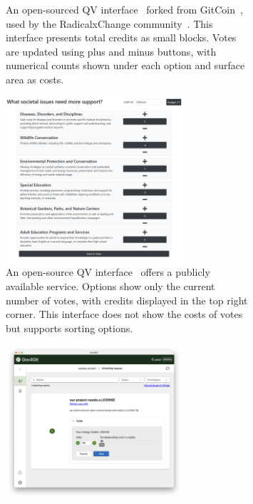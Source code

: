 {\begin{figure}[p]
\begin{subfigure}[b]{0.47\textwidth}
        \caption{An open-sourced QV interface~\cite{RadicalxChangeQuadraticvoting2024} forked from GitCoin~\cite{ReadWhitepaperGitcoin}, used by the RadicalxChange community~\cite{RxC}. This interface presents total credits as small blocks. Votes are updated using plus and minus buttons, with numerical counts shown under each option and surface area as costs.}
        \label{fig:rxcvotingInterface}
    \end{subfigure}
    
    \vspace{0.12cm}
    
    \begin{subfigure}[b]{0.47\textwidth}
        \centering
        \includegraphics[width=0.72\textwidth]{content/image/curr_interface/geek.sg_interface.png}
        \caption{An open-source QV interface~\cite{yehjxraymondYehjxraymondQvapp2024} offers a publicly available service. Options show only the current number of votes, with credits displayed in the top right corner. This interface does not show the costs of votes but supports sorting options.}
        \label{fig:yehInterface}
    \end{subfigure}
    \hspace{0.4cm}
    \begin{subfigure}[b]{0.47\textwidth}
        \centering
        \includegraphics[width=0.72\textwidth]{content/image/curr_interface/appvote.png}

\end{subfigure}
\end{figure}}
